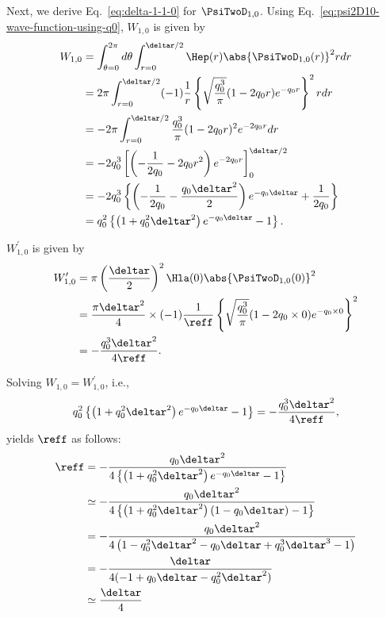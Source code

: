 \documentclass[manuscript_main.tex]{subfiles}
\begin{document}
Next, we derive Eq.~\eqref{eq:delta-1-1-0} for $\PsiTwoD_{1,0}$.
Using Eq.~\eqref{eq:psi2D10-wave-function-using-q0}, $W_{1,0}$ is given by
\begin{align}
  W_{1,0}
   &= \int_{\theta=0}^{2\pi}d\theta
      \int_{r=0}^{\deltar/2}\Hep(r)\abs{\PsiTwoD_{1,0}(r)}^2r dr\notag\\
   &= 2\pi\int_{r=0}^{\deltar/2}
      (-1)\frac{1}{r}
      \left\{\sqrt{\frac{q_0^3}{\pi}}(1-2q_0 r)e^{-q_0 r}\right\}^2
      r dr\notag\\
   &= -2\pi\int_{r=0}^{\deltar/2}\frac{q_0^3}{\pi}(1-2q_0r)^2e^{-2q_0r}dr\notag\\
   &= -2q_0^3\left[\left(-\frac{1}{2q_0}-2q_0r^2\right)e^{-2q_0r}\right]_{0}^{\deltar/2} \notag\\
   &= -2q_0^3\left\{\left(-\frac{1}{2q_0}-\frac{q_0\deltar^2}{2}\right)e^{-q_0\deltar}+\frac{1}{2q_0}\right\}\notag\\
   &= q_0^2\left\{\left(1+q_0^2\deltar^2\right)e^{-q_0\deltar}-1\right\} .
\end{align}

$W_{1,0}^\prime$ is given by
\begin{align}
    W_{1,0}^\prime
    &=\pi\left(\frac{\deltar}{2}\right)^2
         \Hla(0)\abs{\PsiTwoD_{1,0}(0)}^2\notag\\
    &=\frac{\pi\deltar^2}{4}\times(-1)\frac{1}{\reff}
      \left\{\sqrt{\frac{q_0^3}{\pi}}(1-2q_0 \times 0)e^{-q_0 \times 0}\right\}^2\notag\\
    &= -\frac{q_0^3\deltar^2}{4\reff} .
\end{align}

Solving $W_{1,0}=W_{1,0}^\prime$, i.e.,
\begin{equation}
q_0^2\left\{\left(1+q_0^2\deltar^2\right)e^{-q_0\deltar}-1\right\} = -\frac{q_0^3\deltar^2}{4\reff},
\end{equation}
yields $\reff$ as follows:
\begin{align}
\reff&=-\frac{q_0\deltar^2}{4\left\{\left(1+q_0^2\deltar^2\right)e^{-q_0\deltar}-1\right\}}\notag\\
&\simeq-\frac{q_0\deltar^2}{4\left\{\left(1+q_0^2\deltar^2\right)(1-q_0\deltar)-1\right\}}\notag\\
&=-\frac{q_0\deltar^2}{4\left(1-q_0^2\deltar^2-q_0\deltar+q_0^3\deltar^3-1\right)}\notag\\
&=-\frac{\deltar}{4(-1+q_0\deltar-q_0^2\deltar^2)}\notag\\
&\simeq\frac{\deltar}{4}
\end{align}
\end{document}
